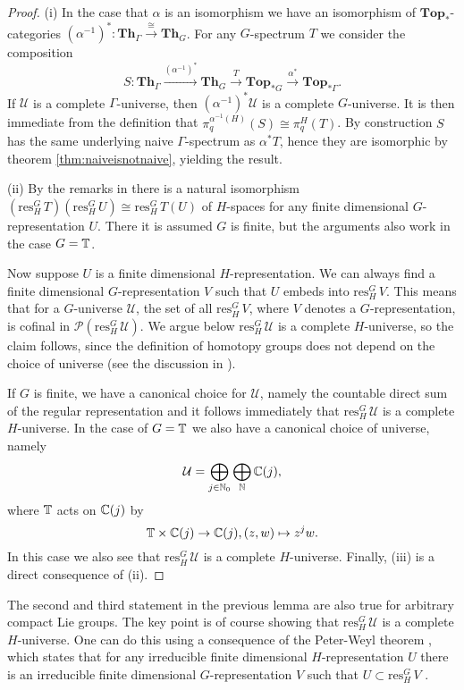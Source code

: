 \begin{proof}
(i) In the case that $\alpha$ is an isomorphism we have an isomorphism of
$\mathbf{Top}_{\ast}$-categories $(\alpha^{-1})^\ast:\mathbf{Th}_\Gamma\xrightarrow{\cong} \mathbf{Th}_G$.
For any $G$-spectrum $T$ we consider the composition
\begin{equation}\label{eq:spectrumrestrictionalternative}
S:\mathbf{Th}_\Gamma\xrightarrow{(\alpha^{-1})^\ast} \mathbf{Th}_G
\xrightarrow{T}\mathbf{Top}_{\ast G}
\xrightarrow{\alpha^\ast} \mathbf{Top}_{\ast \Gamma}.
\end{equation}
If $\mathcal{U}$ is a complete $\Gamma$-universe, then $(\alpha^{-1})^\ast\mathcal{U}$
is a complete $G$-universe. It is then immediate from the definition that 
$\pi_q^{\alpha^{-1}(H)}(S)\cong \pi_q^H(T)$.
By construction $S$ has the same underlying naive $\Gamma$-spectrum as $\alpha^\ast T$,
hence they are isomorphic by theorem \ref{thm:naiveisnotnaive}, yielding the result.

(ii) By the remarks in \cite[Construction~6.7, \pno~1519]{rvadams}
there is a natural isomorphism $(\mathrm{res}^G_H\, T)
(\mathrm{res}^G_H\, U)\cong \mathrm{res}^G_H\, T(U)$
of $H$-spaces
for any finite dimensional $G$-representation $U$.
There it is assumed $G$ is finite, but the arguments
also work in the case $G = \mathbb{T}$.

Now suppose $U$ is a finite dimensional $H$-representation.
We can always find a finite dimensional $G$-representation
$V$ such that $U$ embeds into $\mathrm{res}^G_H\,V$.
This means that for a $G$-universe $\mathcal{U}$,
the set of all $\mathrm{res}^G_H\, V$, where $V$
denotes a $G$-representation, is cofinal in $\mathcal{P}(\mathrm{res}^G_H\,\mathcal{U})$.
We argue below $\mathrm{res}^G_H\,\mathcal{U}$ is a complete
$H$-universe, so the claim follows, since the definition
of homotopy groups does not depend on the
choice of universe (see the discussion in \cite[\pno~1510-1511]{rvadams}).


If $G$ is finite, we have a canonical choice for $\mathcal{U}$,
namely the countable direct sum of the regular representation
and it follows immediately that $\mathrm{res}^G_H\, \mathcal{U}$
is a complete $H$-universe. In the case of $G=\mathbb{T}$ we also 
have a canonical choice of universe, namely
\[
\mathcal{U} = \bigoplus_{j\in \mathbb{N}_0} \bigoplus_{\mathbb{N}} \mathbb{C}(j),
\]
where $\mathbb{T}$ acts on $\mathbb{C}(j)$ by
\[
\mathbb{T}\times \mathbb{C}(j)\to \mathbb{C}(j), (z,w)\mapsto z^jw.
\]
In this case we also see that $\mathrm{res}^G_H\,\mathcal{U}$
is a complete $H$-universe.
Finally, (iii) is a direct consequence of (ii).
\end{proof}
\begin{rem}
The second and third statement in the previous lemma
are also true for arbitrary compact Lie groups. The key point
is of course showing that $\mathrm{res}^G_H\,\mathcal{U}$
is a complete $H$-universe. One can do this using a consequence
of the Peter-Weyl theorem \cite[Theorem~III.3.1, \pno~134]{broeckertomdieckliegroups},
which states that for any irreducible finite dimensional
$H$-representation $U$ there is an irreducible finite dimensional
$G$-representation $V$ such that $U\subset \mathrm{res}^G_H\, V$
\cite[Theorem~III.4.5, \pno~137]{broeckertomdieckliegroups}.
\end{rem}


